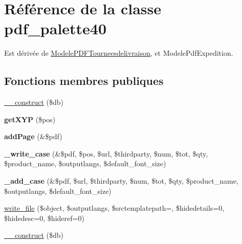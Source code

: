 \hypertarget{classpdf__palette40}{}\section{Référence de la classe pdf\+\_\+palette40}
\label{classpdf__palette40}


Est dérivée de \hyperlink{classModelePDFTourneesdelivraison}{Modele\+P\+D\+F\+Tourneesdelivraison}, et Modele\+Pdf\+Expedition.

\subsection*{Fonctions membres publiques}
\begin{DoxyCompactItemize}
\item 
\hyperlink{classpdf__palette40_a55bd08e699a3e12de75bd4f1ebe01f54}{\+\_\+\+\_\+construct} (\$db)
\item 
\mbox{\label{classpdf__palette40_a96e970fbf39898fd46df24d80c493d34}} 
{\bfseries get\+X\+YP} (\$pos)
\item 
\mbox{\label{classpdf__palette40_a2e9357ed9fe1b4dbd428d5d3bc8c3a59}} 
{\bfseries add\+Page} (\&\$pdf)
\item 
\mbox{\label{classpdf__palette40_ae412be0b169cb1fab06ef8e3f915e1b6}} 
{\bfseries \+\_\+write\+\_\+case} (\&\$pdf, \$pos, \$url, \$thirdparty, \$num, \$tot, \$qty, \$product\+\_\+name, \$outputlangs, \$default\+\_\+font\+\_\+size)
\item 
\mbox{\label{classpdf__palette40_aad5b121efa50f7035aadbbc9befd1e9d}} 
{\bfseries \+\_\+add\+\_\+case} (\&\$pdf, \$url, \$thirdparty, \$num, \$tot, \$qty, \$product\+\_\+name, \$outputlangs, \$default\+\_\+font\+\_\+size)
\item 
\hyperlink{classpdf__palette40_a6177500b1125aa13a769671bc0a1e231}{write\+\_\+file} (\$object, \$outputlangs, \$srctemplatepath=\textquotesingle{}\textquotesingle{}, \$hidedetails=0, \$hidedesc=0, \$hideref=0)
\item 
\hyperlink{classpdf__palette40_a55bd08e699a3e12de75bd4f1ebe01f54}{\+\_\+\+\_\+construct} (\$db)
\item 
\mbox{\label{classpdf__palette40_a96e970fbf39898fd46df24d80c493d34}} 

\end{DoxyCompactItemize}
